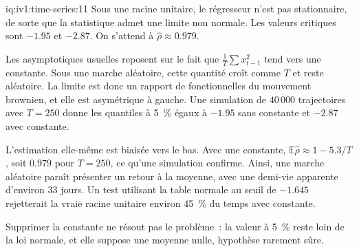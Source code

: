 \begin{solution}{iq:iv1:time-series:11}
Sous une racine unitaire, le régresseur n'est pas stationnaire, de sorte que la statistique admet une limite non normale. Les valeurs critiques sont $-1.95$ et $-2.87$. On s'attend à $\hat{\rho} \approx 0.979$.

Les asymptotiques usuelles reposent sur le fait que $\frac{1}{T}\sum x_{t - 1}^2$ tend vers une constante. Sous une marche aléatoire, cette quantité croît comme $T$ et reste aléatoire. La limite est donc un rapport de fonctionnelles du mouvement brownien, et elle est asymétrique à gauche. Une simulation de $40\,000$ trajectoires avec $T = 250$ donne les quantiles à 5~\% égaux à $-1.95$ sans constante et $-2.87$ avec constante.

L'estimation elle-même est biaisée vers le bas. Avec une constante, $\mathbb{E}\hat{\rho} \approx 1 - 5.3/T$, soit $0.979$ pour $T = 250$, ce qu'une simulation confirme. Ainsi, une marche aléatoire paraît présenter un retour à la moyenne, avec une demi-vie apparente d'environ 33 jours. Un test utilisant la table normale au seuil de $-1.645$ rejetterait la vraie racine unitaire environ 45~\% du temps avec constante.

Supprimer la constante ne résout pas le problème~: la valeur à 5~\% reste loin de la loi normale, et elle suppose une moyenne nulle, hypothèse rarement sûre.



\end{solution}

